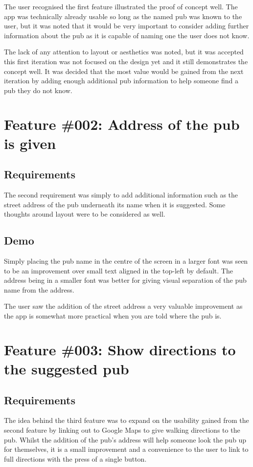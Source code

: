 \documentclass{report}
\begin{document}
The user recognised the first feature illustrated the proof of concept
well. The app was technically already usable so long as the named pub
was known to the user, but it was noted that it would be very important
to consider adding further information about the pub as it is capable
of naming one the user does not know.

The lack of any attention to layout or aesthetics was noted, but it was
accepted this first iteration was not focused on the design yet and it
still demonstrates the concept well. It was decided that the most
value would be gained from the next iteration by adding enough
additional pub information to help someone find a pub they do not know.

\section{Feature \#002: Address of the pub is given}
\subsection{Requirements}

The second requirement was simply to add additional information such as
the street address of the pub underneath its name when it is suggested.
Some thoughts around layout were to be considered as well.

\subsection{Demo}

Simply placing the pub name in the centre of the screen in a larger font
was seen to be an improvement over small text aligned in the top-left
by default. The address being in a smaller font was better for giving
visual separation of the pub name from the address.

The user saw the addition of the street address a very valuable improvement
as the app is somewhat more practical when you are told where the pub is.

\section{Feature \#003: Show directions to the suggested pub}
\subsection{Requirements}

The idea behind the third feature was to expand on the usability gained
from the second feature by linking out to Google Maps to give walking
directions to the pub. Whilst the addition of the pub's address will
help someone look the pub up for themselves, it is a small improvement
and a convenience to the user to link to full directions with the press
of a single button.
\end{document}
